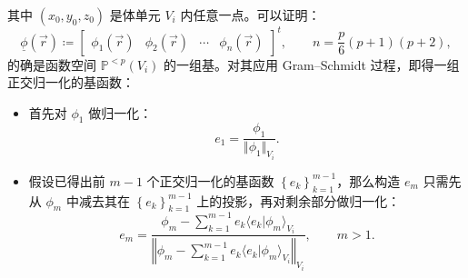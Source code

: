 其中 $(x_{0},y_{0},z_{0})$ 是体单元 $V_{i}$ 内任意一点。可以证明：
\begin{equation}
\underline{\phi}(\vec{r})\coloneqq\begin{bmatrix}\phi_{1}(\vec{r}) & \phi_{2}(\vec{r}) & \cdots & \phi_{n}(\vec{r})\end{bmatrix}^{t},\qquad n=\frac{p}{6}(p+1)(p+2),
\end{equation}
的确是函数空间 $\mathbb{P}^{<p}(V_{i})$ 的一组基。对其应用 Gram–Schmidt 过程，即得一组正交归一化的基函数：
\begin{itemize}
\item 首先对 $\phi_{1}$ 做归一化：
\begin{equation}
e_{1}=\frac{\phi_{1}}{\Vert\phi_{1}\Vert_{V_{i}}}.
\end{equation}
\item 假设已得出前 $m-1$ 个正交归一化的基函数 $\left\{ e_{k}\right\} _{k=1}^{m-1}$，那么构造
$e_{m}$ 只需先从 $\phi_{m}$ 中减去其在 $\left\{ e_{k}\right\} _{k=1}^{m-1}$
上的投影，再对剩余部分做归一化：
\begin{equation}
e_{m}=\frac{\phi_{m}-\sum_{k=1}^{m-1}e_{k}\langle e_{k}\vert\phi_{m}\rangle_{V_{i}}}{\left\Vert \phi_{m}-\sum_{k=1}^{m-1}e_{k}\langle e_{k}\vert\phi_{m}\rangle_{V_{i}}\right\Vert _{V_{i}}},\qquad m>1.\label{eq:ortho-normal}
\end{equation}
\end{itemize}

